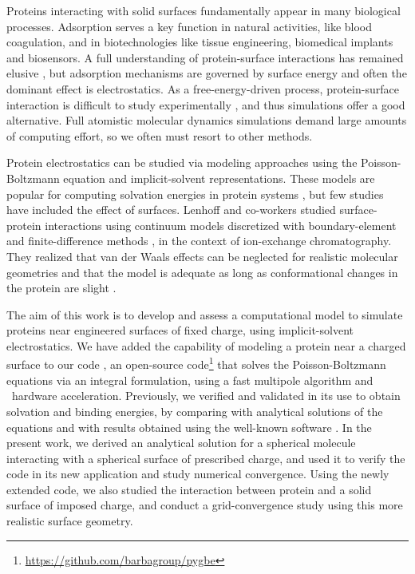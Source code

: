 
Proteins interacting with solid surfaces fundamentally appear in many biological processes. Adsorption serves a key function in natural activities, like blood coagulation, and  in biotechnologies like tissue engineering, biomedical implants and biosensors.
A full understanding of protein-surface interactions has remained elusive \cite{Gray2004,RabeVerdesSeegel2011}, but adsorption mechanisms are governed by surface energy and often the dominant effect is electrostatics. As a free-energy-driven process, protein-surface interaction is difficult to study experimentally \cite{MijajlovicETal2013}, and thus simulations offer a good alternative. Full atomistic molecular dynamics simulations demand large amounts of computing effort, so we often must resort to other methods.

Protein electrostatics can be studied via modeling approaches using the Poisson-Boltzmann equation and implicit-solvent representations. These models  are popular for computing solvation energies in protein systems \cite{RouxSimonson1999,Bardhan2012}, but few studies have included the effect of surfaces. Lenhoff and co-workers studied surface-protein interactions using continuum models discretized with boundary-element \cite{YoonLenhoff1992,RothLenhoff1993,AsthagiriLenhoff1997} and finite-difference methods \cite{YaoLenhoff2004,YaoLenhoff2005}, in the context of ion-exchange chromatography. They realized that van der Waals effects can be neglected for realistic molecular geometries \cite{RothNealLenhoff1996} and that the model is adequate as long as conformational changes in the protein are slight \cite{YaoLenhoff2004,YaoLenhoff2005}. 

The aim of this work is to develop and assess a computational model to simulate proteins near engineered surfaces of fixed charge, using implicit-solvent electrostatics.
We have added the capability of modeling a protein near a charged surface to our code \pygbe, an open-source code\footnote{\url{https://github.com/barbagroup/pygbe}}  that solves the Poisson-Boltzmann equations via an integral formulation, using a fast multipole algorithm and \gpu\ hardware acceleration.  Previously, we verified and validated \pygbe in its use to obtain solvation and binding energies, by comparing with analytical solutions of the equations and with results obtained using the well-known \apbs software \cite{CooperBarba-share154331,CooperBardhanBarba2013}. 
In the present work, we derived an analytical solution for a spherical molecule interacting with a spherical surface of prescribed charge, and used it to verify the code in its new application and study numerical convergence.
Using the newly extended code, we also studied the interaction between protein \gb and a solid surface of imposed charge, 
and conduct a grid-convergence study using this more realistic surface geometry.

